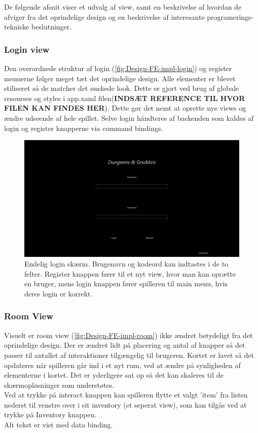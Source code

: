 \noindent De følgende afsnit viser et udvalg af view, samt en beskrivelse af hvordan de afviger fra det oprindelige design og en beskrivelse af interesante programerings-tekniske beslutninger.

\subsubsection{Login view}
Den overordnede struktur af login (\autoref{fig:Design-FE-impl-login}) og register menuerne følger meget tæt det oprindelige design. Alle elementer er blevet stiliseret så de matcher det ønskede look. Dette er gjort ved brug af globale resourses og styles i app.xaml filen(\textbf{INDSÆT REFERENCE TIL HVOR FILEN KAN FINDES HER}). Dette gør det nemt at oprette nye views og ændre udseende af hele spillet. Selve login håndteres af backenden som kaldes af login og register knapperne via command bindings.

\begin{figure}[H]
\centering
\includegraphics[width = \textwidth]{02-Body/Images/login_final.PNG}
\caption{Endelig login skærm. Brugenavn og kodeord kan indtastes i de to felter. Register knappen fører til et nyt view, hvor man kan oprætte en bruger, mens login knappen fører spilleren til main menu, hvis deres login er korrekt.}
\label{fig:Design-FE-impl-login}
\end{figure}

\subsubsection{Room View}

Visuelt er room view (\autoref{fig:Design-FE-impl-room}) ikke ændret betydeligt fra det oprindelige design. Der er ændret lidt på placering og antal af knapper så det passer til antallet af interaktioner tilgængelig til brugeren. Kortet er lavet så det  opdateres når spilleren går ind i et nyt rum, ved at ændre på synligheden af elementerne i kortet. Det er yderligere sat op så det kan skaleres til de skærmopløsninger som understøtes.\\
Ved at trykke på interact knappen kan spilleren flytte et valgt 'item' fra listen nederst til venstre over i sit inventory (et seperat view), som kan tilgås ved at trykke på Inventory knappen.\\
Alt tekst er vist med data binding.

